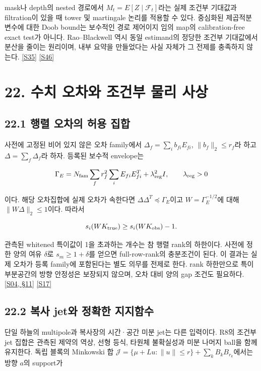 \documentclass[11pt,a4paper]{article}
\begin{document}
mask나 depth의 nested 경로에서 \(M_t=E[Z\mid\mathcal F_t]\)라는 실제 조건부 기대값과 filtration이 있을 때 tower 및 martingale 논리를 적용할 수 있다. 중심화된 제곱적분 변수에 대한 Doob bound는 보수적인 경로 제어이지 임의 map의 calibration-free exact test가 아니다. Rao–Blackwell 역시 동일 estimand의 정당한 조건부 기대값에서 분산을 줄이는 원리이며, 내부 요약을 만들었다는 사실 자체가 그 전제를 충족하지 않는다. \hyperlink{src:S35}{[S35]} \hyperlink{src:S46}{[S46]}


\hypertarget{s22}{}

\section*{22. 수치 오차와 조건부 물리 사상}


\subsection*{22.1 행렬 오차의 허용 집합}

사전에 고정된 비어 있지 않은 오차 family에서 \(\Delta_f=\sum_i b_{fi}E_{fi}\), \(\|b_f\|_2\le r_f\)라 하고 \(\Delta=\sum_f\Delta_f\)라 하자. 등록된 보수적 envelope는


\[
\Gamma_E=N_{\rm fam}\sum_f r_f^2\sum_iE_{fi}E_{fi}^T
+\lambda_{\rm reg}^2I,\qquad\lambda_{\rm reg}>0
\]

이다. 해당 오차집합에 실제 오차가 속한다면 \(\Delta\Delta^T\preceq\Gamma_E\)이고 \(W=\Gamma_E^{-1/2}\)에 대해 \(\|W\Delta\|_2\le1\)이다. 따라서


\[
s_i(WK_{\rm true})\ge s_i(WK_{\rm obs})-1.
\]

관측된 whitened 특이값이 1을 초과하는 개수는 참 행렬 rank의 하한이다. 사전에 정한 양의 여유 \(\delta\)로 \(s_m\ge1+\delta\)를 얻으면 full-row-rank의 충분조건이 된다. 이 결과는 실제 오차가 등록 family에 포함된다는 별도 의무를 전제로 한다. rank 하한만으로 특이 부분공간의 방향 안정성은 보장되지 않으며, 오차 대비 양의 gap 조건도 필요하다. \hyperlink{src:S04}{[S04, §11]} \hyperlink{src:S17}{[S17]}


\subsection*{22.2 복사 jet와 정확한 지지함수}

단일 하늘의 multipole과 복사장의 시간·공간 미분 jet는 다른 입력이다. R8의 조건부 jet 집합은 관측된 제약의 역상, 선형 등식, 타원체 불확실성과 미분 나머지 ball을 함께 유지한다. 독립 블록의 Minkowski 합 \(\mathcal J=\{\mu+Lu:\|u\|\le r\}+\sum_kB_kB_{r_k}\)에서는 방향 \(a\)의 support가
\end{document}
